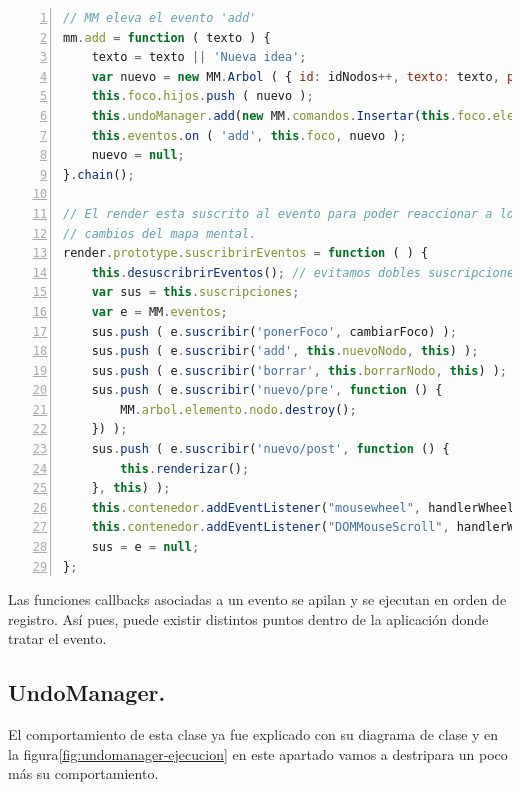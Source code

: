 \begin{lstlisting}[language=JavaScript, numbers=left]
// MM eleva el evento 'add'
mm.add = function ( texto ) {
    texto = texto || 'Nueva idea';
    var nuevo = new MM.Arbol ( { id: idNodos++, texto: texto, plegado: false,  nodo: null } );
    this.foco.hijos.push ( nuevo );
    this.undoManager.add(new MM.comandos.Insertar(this.foco.elemento.id, nuevo.elemento.id, texto) );
    this.eventos.on ( 'add', this.foco, nuevo );
    nuevo = null;
}.chain();

// El render esta suscrito al evento para poder reaccionar a los 
// cambios del mapa mental.
render.prototype.suscribrirEventos = function ( ) {
    this.desuscribrirEventos(); // evitamos dobles suscripciones
    var sus = this.suscripciones;
    var e = MM.eventos;
    sus.push ( e.suscribir('ponerFoco', cambiarFoco) );
    sus.push ( e.suscribir('add', this.nuevoNodo, this) );
    sus.push ( e.suscribir('borrar', this.borrarNodo, this) );
    sus.push ( e.suscribir('nuevo/pre', function () {
        MM.arbol.elemento.nodo.destroy();
    }) );
    sus.push ( e.suscribir('nuevo/post', function () {
        this.renderizar();
    }, this) );
    this.contenedor.addEventListener("mousewheel", handlerWheel, false);
    this.contenedor.addEventListener("DOMMouseScroll", handlerWheel, false);
    sus = e = null;
};
\end{lstlisting}

Las funciones callbacks asociadas a un evento se apilan y se ejecutan en orden de registro. Así pues, puede existir distintos puntos dentro de la aplicación donde tratar el evento.

\subsection{UndoManager.}
El comportamiento de esta clase ya fue explicado con su diagrama de clase y en la figura\ref{fig:undomanager-ejecucion} en este apartado vamos a destripara un poco más su comportamiento.


